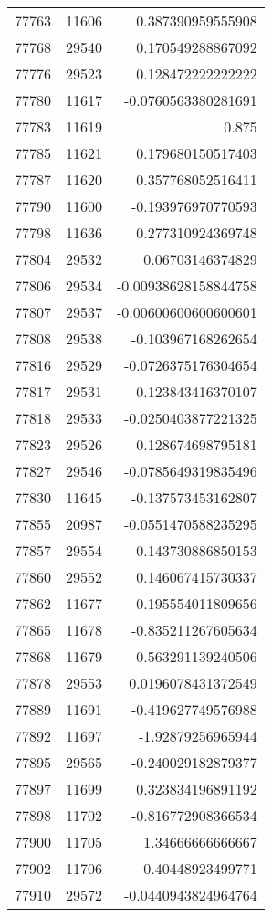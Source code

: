 \begin{tabular}{r | r | r}
77763 & 11606 & 0.387390959555908 \\
77768 & 29540 & 0.170549288867092 \\
77776 & 29523 & 0.128472222222222 \\
77780 & 11617 & -0.0760563380281691 \\
77783 & 11619 & 0.875 \\
77785 & 11621 & 0.179680150517403 \\
77787 & 11620 & 0.357768052516411 \\
77790 & 11600 & -0.193976970770593 \\
77798 & 11636 & 0.277310924369748 \\
77804 & 29532 & 0.06703146374829 \\
77806 & 29534 & -0.00938628158844758 \\
77807 & 29537 & -0.00600600600600601 \\
77808 & 29538 & -0.103967168262654 \\
77816 & 29529 & -0.0726375176304654 \\
77817 & 29531 & 0.123843416370107 \\
77818 & 29533 & -0.0250403877221325 \\
77823 & 29526 & 0.128674698795181 \\
77827 & 29546 & -0.0785649319835496 \\
77830 & 11645 & -0.137573453162807 \\
77855 & 20987 & -0.0551470588235295 \\
77857 & 29554 & 0.143730886850153 \\
77860 & 29552 & 0.146067415730337 \\
77862 & 11677 & 0.195554011809656 \\
77865 & 11678 & -0.835211267605634 \\
77868 & 11679 & 0.563291139240506 \\
77878 & 29553 & 0.0196078431372549 \\
77889 & 11691 & -0.419627749576988 \\
77892 & 11697 & -1.92879256965944 \\
77895 & 29565 & -0.240029182879377 \\
77897 & 11699 & 0.323834196891192 \\
77898 & 11702 & -0.816772908366534 \\
77900 & 11705 & 1.34666666666667 \\
77902 & 11706 & 0.40448923499771 \\
77910 & 29572 & -0.0440943824964764 \\

\end{tabular}
